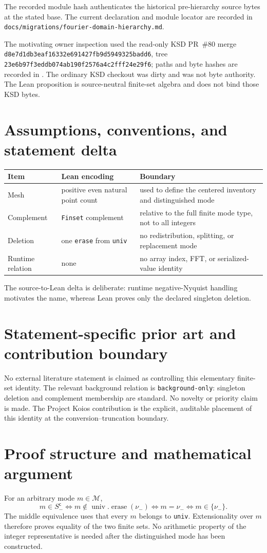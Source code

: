 \documentclass[11pt]{article}
\begin{document}
The recorded module hash authenticates the historical pre-hierarchy source bytes at the stated base. The current declaration and module locator are recorded in \texttt{docs/migrations/fourier-domain-hierarchy.md}.

The motivating owner inspection used the read-only KSD PR~\#80 merge
\texttt{d8e7d1db3eaf16332e691427fb9d5949325badd6}, tree
\texttt{23e6b97f3eddb074ab190f2576a4c2fff24e29f6}; paths and byte hashes are recorded in
.  The ordinary KSD checkout was dirty and was not byte authority.
The Lean proposition is source-neutral finite-set algebra and does not bind those KSD bytes.

\section{Assumptions, conventions, and statement delta}
\begin{tabularx}{\textwidth}{@{}lXX@{}}
\toprule
Item & Lean encoding & Boundary \\
\midrule
Mesh & positive even natural point count & used to define the centered inventory and distinguished mode \\
Complement & \texttt{Finset} complement & relative to the full finite mode type, not to all integers \\
Deletion & one \texttt{erase} from \texttt{univ} & no redistribution, splitting, or replacement mode \\
Runtime relation & none & no array index, FFT, or serialized-value identity \\
\bottomrule
\end{tabularx}
The source-to-Lean delta is deliberate: runtime negative-Nyquist handling motivates the name,
whereas Lean proves only the declared singleton deletion.

\section{Statement-specific prior art and contribution boundary}
No external literature statement is claimed as controlling this elementary finite-set identity.
The relevant background relation is \texttt{background-only}: singleton deletion and complement
membership are standard.  No novelty or priority claim is made.  The Project Koios contribution is
the explicit, auditable placement of this identity at the conversion--truncation boundary.

\section{Proof structure and mathematical argument}
For an arbitrary mode $m\in\mathcal M$,
\[
 m\in S_-^{\mathsf c}
 \iff m\notin\operatorname{univ}.\operatorname{erase}(\nu_-)
 \iff m=\nu_-
 \iff m\in\{\nu_-\}.
\]
The middle equivalence uses that every $m$ belongs to \texttt{univ}.  Extensionality over $m$
therefore proves equality of the two finite sets.  No arithmetic property of the integer
representative is needed after the distinguished mode has been constructed.
\end{document}
